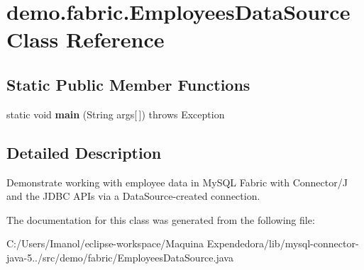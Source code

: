 \hypertarget{classdemo_1_1fabric_1_1_employees_data_source}{}\section{demo.\+fabric.\+Employees\+Data\+Source Class Reference}
\label{classdemo_1_1fabric_1_1_employees_data_source}
\subsection*{Static Public Member Functions}
\begin{DoxyCompactItemize}
\item 
\mbox{\label{classdemo_1_1fabric_1_1_employees_data_source_ae6a447eafa155208814b99c1418c41d0}} 
static void {\bfseries main} (String args\mbox{[}$\,$\mbox{]})  throws Exception 
\end{DoxyCompactItemize}


\subsection{Detailed Description}
Demonstrate working with employee data in My\+S\+QL Fabric with Connector/J and the J\+D\+BC A\+P\+Is via a Data\+Source-\/created connection. 

The documentation for this class was generated from the following file\+:\begin{DoxyCompactItemize}
\item 
C\+:/\+Users/\+Imanol/eclipse-\/workspace/\+Maquina Expendedora/lib/mysql-\/connector-\/java-\/5../src/demo/fabric/Employees\+Data\+Source.\+java\end{DoxyCompactItemize}
